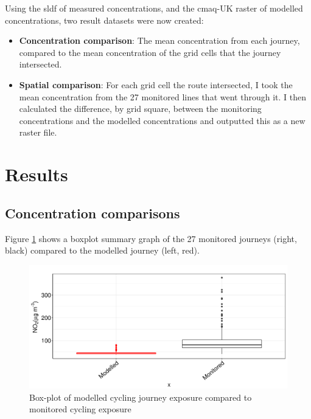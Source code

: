 Using the \gls{sldf} of measured concentrations, and the \gls{cmaq}-UK raster of modelled concentrations, two result datasets were now created:
\begin{itemize}
    \item \textbf{Concentration comparison}: The mean concentration from each journey, compared to the mean concentration of the grid cells that the journey intersected.
    \item \textbf{Spatial comparison}: For each grid cell the route intersected, I took the mean concentration from the 27 monitored lines that went through it. I then calculated the difference, by grid square, between the monitoring concentrations and the modelled concentrations and outputted this as a new raster file.
\end{itemize}

\section{Results}
\label{sec:4results}

\subsection{Concentration comparisons}
\label{subsec:concentrationcomparisons}

Figure \ref{fig:grouped_journey_boxplots} shows a boxplot summary graph of the 27 monitored journeys (right, black) compared to the modelled journey (left, red).

\begin{figure}[H]
\centering
\includegraphics[scale=0.5]{images/grouped_journey_boxplots.png}
\caption{Box-plot of modelled cycling journey exposure compared to monitored cycling exposure}
\label{fig:grouped_journey_boxplots}
\end{figure}

